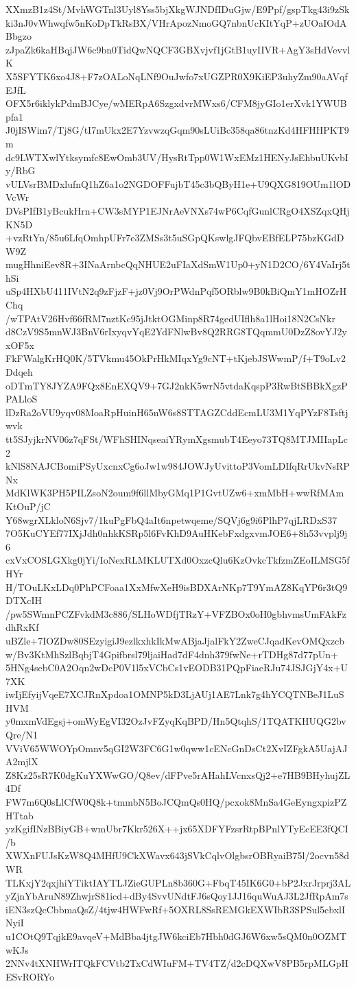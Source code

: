 XXmzB1z4St/MvhWGTnl3Uyl8Yss5bjXkgWJNDfIDuGjw/E9Ppf/gspTkg43i9zSk
ki3nJ0vWhwqfw5nKoDpTkRsBX/VHrApozNmoGQ7nbnUcKItYqP+zUOaIOdABbgzo
zJpaZk6kaHBqjJW6c9bn0TidQwNQCF3GBXvjvf1jGtB1uyIIVR+AgY3sHdVevvlK
X5SFYTK6xo4J8+F7zOALoNqLNf9OuJwfo7xUGZPR0X9KiEP3uhyZm90aAVqfEJfL
OFX5r6iklykPdmBJCye/wMERpA6SzgxdvrMWxs6/CFM8jyGIo1erXvk1YWUBpfa1
J0jISWim7/Tj8G/tI7mUkx2E7YzvwzqGqm90sLUiBc358qa86tnzKd4HFHHPKT9m
dc9LWTXwlYtksymfc8EwOmb3UV/HysRtTpp0W1WxEMz1HENyJsEhbuUKvbIy/RbG
vULVsrBMDxlufnQ1hZ6a1o2NGDOFFujbT45c3bQByH1e+U9QXG819OUm1lODVcWr
DVsPIfB1yBcukHrn+CW3sMYP1EJNrAeVNXs74wP6CqfGunlCRgO4XSZqxQHjKN5D
+vzRtYn/85u6LfqOmhpUFr7e3ZMSs3t5uSGpQKswlgJFQbvEBfELP75bzKGdDW9Z
mugHhniEev8R+3INaArnbcQqNHUE2uFIaXdSmW1Up0+yN1D2CO/6Y4VaIrj5thSi
uSp4HXbU411IVtN2q9zFjzF+jz0Vj9OrPWdnPqf5ORblw9B0kBiQmY1mHOZrHChq
/wTPAtV26Hvf66fRM7nztKc95jJtktOGMinp8R74gedUIflh8a1lHoi18N2CsNkr
d8CzV9S5mnWJ3BnV6rIxyqvYqE2YdFNlwBv8Q2RRG8TQqmmU0DzZ8ovYJ2yxOF5x
FkFWalgKrHQ0K/5TVkmu45OkPrHkMIqxYg9cNT+tKjebJSWwmP/f+T9oLv2Ddqeh
oDTmTY8JYZA9FQx8EnEXQV9+7GJ2nkK5wrN5vtdaKqspP3RwBtSBBkXgzPPALloS
lDzRa2oVU9yqv08MoaRpHuinH65nW6s8STTAGZCddEcmLU3M1YqPYzF8Tsftjwvk
tt5SJyjkrNV06z7qFSt/WFhSHINqseaiYRymXgsmubT4Eeyo73TQ8MTJMIIapLc2
kNlS8NAJCBomiPSyUxcnxCg6oJw1w984JOWJyUvittoP3VomLDIfqRrUkvNsRPNx
MdKlWK3PH5PILZsoN2oum9f6llMbyGMq1P1GvtUZw6+xmMbH+wwRfMAmKtOuP/jC
Y68wgrXLkloN6Sjv7/1kuPgFbQ4aIt6npetwqeme/SQVj6g9i6PlhP7qjLRDxS37
7O5KuCYEf77IXjJdh0nhkKSRp5l6FvKhD9AuHKebFxdgxvmJOE6+8h53vvplj9j6
cxVxCOSLGXkg0jYi/IoNexRLMKLUTXd0OxzcQlu6KzOvkcTkfzmZEoILMSG5fHYr
H/TOuLKxLDq0PhPCFoaa1XxMfwXeH9isBDXArNKp7T9YmAZ8KqYP6r3tQ9DTXcIH
/pw5SWmnPCZFvkdM3c886/SLHoWDfjTRzY+VFZBOx0oH0gbhvmsUmFAkFzdhRxKf
uBZle+7IOZDw80SEzyigiJ9ezlkxhkIkMwABjaJjalFkY2ZweCJqadKevOMQxzcb
w/Bv3KtMhSzlBqbjT4Gpifbrsl79ljaiHad7dF4dnh379fwNe+rTDHg87d77pUn+
5HNg4sebC0A2Oqn2wDcP0V1l5xVCbCs1vEODB31PQpFiaeRJu74JSJGjY4x+U7XK
iwIjEfyijVqeE7XCJRnXpdoa1OMNP5kD3LjAUj1AE7Lnk7g4hYCQTNBeJ1LuSHVM
y0mxmVdEgsj+omWyEgVI32OzJvFZyqKqBPD/Hn5QtqhS/1TQATKHUQG2bvQre/N1
VViV65WWOYpOmnv5qGI2W3FC6G1w0qww1cENcGnDsCt2XvIZFgkA5UajAJA2mjlX
Z8Kz25sR7K0dgKuYXWwGO/Q8ev/dFPve5rAHahLVcnxsQj2+e7HB9BHyhujZL4Df
FW7m6Q0sLlCfW0Q8k+tmmbN5BoJCQmQs0HQ/pcxok8MnSa4GeEyngxpizPZHTtab
yzKgifINzBBiyGB+wmUbr7Kkr526X++jx65XDFYFzsrRtpBPnlYTyEcEE3fQCI/b
XWXnFUJsKzW8Q4MHfU9CkXWavx643jSVkCqlvOlgbsrOBRyaiB75l/2ocvn58dWR
TLKxjY2qxjhiYTiktIAYTLJZieGUPLn8b360G+FbqT45IK6G0+bP2JxrJrprj3AL
yZjnYbAruN89ZhwjrS81icd+dBy4SvvUNdtFJ6sQoy1JJ16quWuAJ3L2JfRpAm7s
iEN3szQcCbbmaQsZ/4tjw4HWFwRf+5OXRL8SsREMGkEXWIbR3SPSul5cbxlINyiI
u1COtQ9TqjkE9avqeV+MdBba4jtgJW6kciEb7Hbh0dGJ6W6xw5sQM0n0OZMTwKJs
2NNv4tXNHWrITQkFCVtb2TxCdWIuFM+TV4TZ/d2cDQXwV8PB5rpMLGpHESvRORYo
